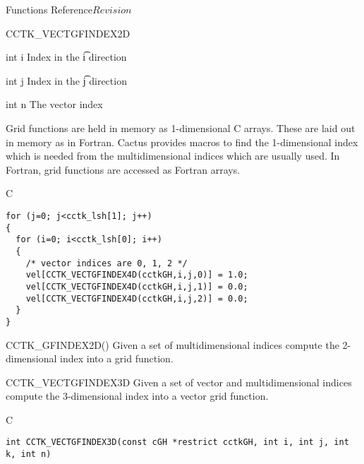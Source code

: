 \begin{cactuspart}{ Functions Reference}{}{$Revision$}
\begin{FunctionDescription}{CCTK\_VECTGFINDEX2D}
\begin{ParameterSection}
\begin{Parameter} {int i}
Index in the \t{i} direction
\end{Parameter}

\begin{Parameter} {int j}
Index in the \t{j} direction
\end{Parameter}

\begin{Parameter} {int n}
The vector index
\end{Parameter}
\end{ParameterSection}

\begin{Discussion}
Grid functions are held in memory as 1-dimensional C arrays. These are
laid out in memory as in Fortran. Cactus provides macros to find the
1-dimensional index which is needed from the multidimensional indices which
are usually used. In Fortran, grid functions are accessed as Fortran arrays.
\end{Discussion}
\begin{ExampleSection}
\begin{Example}{C}
\begin{verbatim}
for (j=0; j<cctk_lsh[1]; j++)
{
  for (i=0; i<cctk_lsh[0]; i++)
  {
    /* vector indices are 0, 1, 2 */
    vel[CCTK_VECTGFINDEX4D(cctkGH,i,j,0)] = 1.0;
    vel[CCTK_VECTGFINDEX4D(cctkGH,i,j,1)] = 0.0;
    vel[CCTK_VECTGFINDEX4D(cctkGH,i,j,2)] = 0.0;
  }
}
\end{verbatim}
\end{Example}
\end{ExampleSection}
\begin{SeeAlsoSection}
\begin{SeeAlso}{CCTK\_GFINDEX2D()}
Given a set of multidimensional indices compute the 2-dimensional index into a
grid function.
\end{SeeAlso}

\end{SeeAlsoSection}
\end{FunctionDescription}



\begin{FunctionDescription}{CCTK\_VECTGFINDEX3D}
\label{CCTK-VECTGFINDEX3D}
Given a set of vector and multidimensional indices compute the 3-dimensional
index into a vector grid function.
\begin{SynopsisSection}
\begin{Synopsis}{C}
\begin{verbatim}
int CCTK_VECTGFINDEX3D(const cGH *restrict cctkGH, int i, int j, int k, int n)
\end{verbatim}
\end{Synopsis}
\end{SynopsisSection}


\end{FunctionDescription}
\end{cactuspart}
